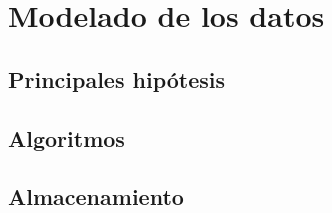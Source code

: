 \chapter{Modelado de los datos}
\section{Principales hip\'otesis}
\section{Algoritmos}
\section{Almacenamiento}